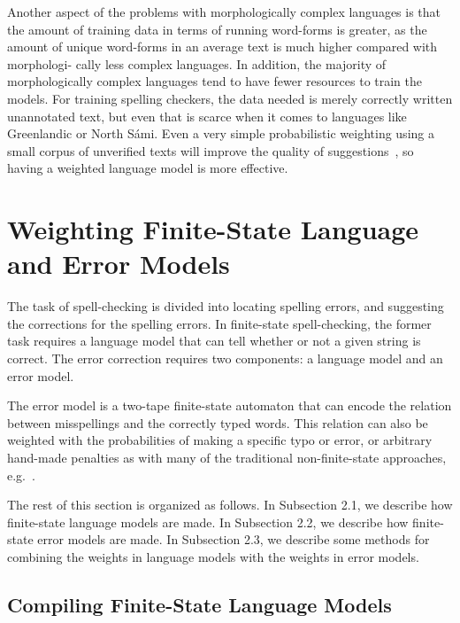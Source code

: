 \documentclass[postprint]{flammie}
\begin{document}
Another aspect of the problems with morphologically complex languages is that
the amount of training data in terms of running word-forms is greater, as the
amount of unique word-forms in an average text is much higher compared with
morphologi- cally less complex languages. In addition, the majority of
morphologically complex languages tend to have fewer resources to train the
models. For training spelling checkers, the data needed is merely correctly
written unannotated text, but even that is scarce when it comes to languages
like Greenlandic or North Sámi. Even a very simple probabilistic weighting
using a small corpus of unverified texts will improve the quality of
suggestions~\cite{pirinen2010creating}, so having a weighted language model is
more effective.

\section{Weighting Finite-State Language and Error Models}

The task of spell-checking is divided into locating spelling errors, and
suggesting the corrections for the spelling errors. In finite-state
spell-checking, the former task requires a language model that can tell
whether or not a given string is correct. The error correction requires two
components: a language model and an error model.

The error model is a two-tape finite-state automaton that can encode the
relation between misspellings and the correctly typed words. This relation can
also be weighted with the probabilities of making a specific typo or error, or
arbitrary hand-made penalties as with many of the traditional non-finite-state
approaches, e.g.~\cite{hunspell}.

The rest of this section is organized as follows. In Subsection 2.1, we
describe how finite-state language models are made. In Subsection 2.2, we
describe how finite-state error models are made. In Subsection 2.3, we describe
some methods for combining the weights in language models with the weights in
error models.


\subsection{Compiling Finite-State Language Models}
\end{document}
